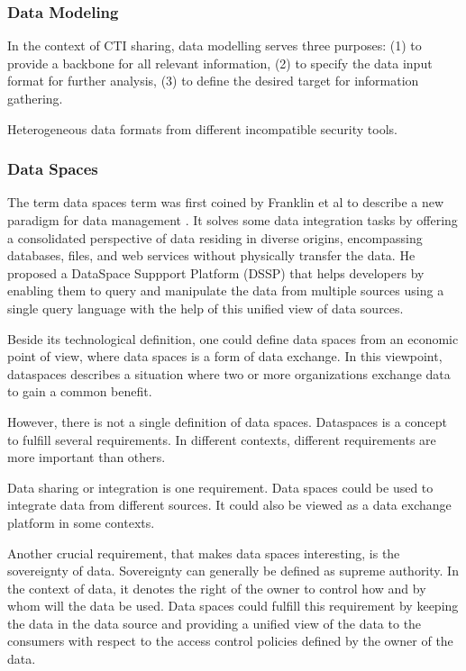 \documentclass{article}
\begin{document}
\subsubsection*{Data Modeling}
In the context of CTI sharing, data modelling serves three purposes: (1) to provide a backbone for all relevant information, (2) to specify the data input format for further analysis, (3) to define the desired target for information gathering. \cite{husak_crusoe_2022}

Heterogeneous data formats from different incompatible security tools.

\subsubsection*{Data Spaces}
The term data spaces term was first coined by Franklin et al to describe a new paradigm for data management \cite{franklin_databases_2005}. It solves some data integration tasks by offering a consolidated perspective of data residing in diverse origins, encompassing databases, files, and web services without physically transfer the data. He proposed a DataSpace Suppport Platform (DSSP) that helps developers by enabling them to query and manipulate the data from multiple sources using a single query language with the help of this unified view of data sources.

Beside its technological definition, one could define data spaces from an economic point of view, where data spaces is a form of data exchange. In this viewpoint, dataspaces describes a situation where two or more organizations exchange data to gain a common benefit. \cite{reiberg_what_2022}

However, there is not a single definition of data spaces. Dataspaces is a concept to fulfill several requirements. In different contexts, different requirements are more important than others. 

Data sharing or integration is one requirement. Data spaces could be used to integrate data from different sources. It could also be viewed as a data exchange platform in some contexts.

Another crucial requirement, that makes data spaces interesting, is the sovereignty of data. Sovereignty can generally be defined as supreme authority. In the context of data, it denotes the right of the owner to control how and by whom will the data be used. Data spaces could fulfill this requirement by keeping the data in the data source and providing a unified view of the data to the consumers with respect to the access control policies defined by the owner of the data.
\end{document}
